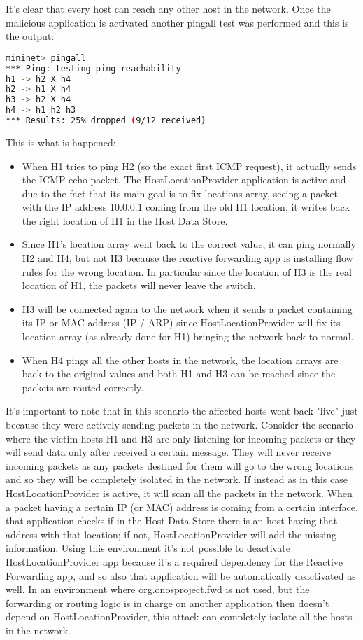 \documentclass[a4paper,10pt]{memoir}
\begin{document}
It's clear that every host can reach any other host in the network. Once the malicious application is activated another pingall test was performed and this is the output:
\begin{lstlisting}[language=bash]
mininet> pingall
*** Ping: testing ping reachability
h1 -> h2 X h4
h2 -> h1 X h4
h3 -> h2 X h4
h4 -> h1 h2 h3
*** Results: 25% dropped (9/12 received)
\end{lstlisting}

This is what is happened:
\begin{itemize}
    \item When H1 tries to ping H2 (so the exact first ICMP request), it actually sends the ICMP echo packet. The HostLocationProvider application is active and due to the fact that its main goal is to fix locations array, seeing a packet with the IP address 10.0.0.1 coming from the old H1 location, it writes back the right location of H1 in the Host Data Store.
    \item Since H1's location array went back to the correct value, it can ping normally H2 and H4, but not H3 because the reactive forwarding app is installing flow rules for the wrong location. In particular since the location of H3 is the real location of H1, the packets will never leave the switch.
    \item H3 will be connected again to the network when it sends a packet containing its IP or MAC address (IP / ARP) since HostLocationProvider will fix its location array (as already done for H1) bringing the network back to normal.
    \item When H4 pings all the other hosts in the network, the location arrays are back to the original values and both H1 and H3 can be reached since the packets are routed correctly.
\end{itemize}

It's important to note that in this scenario the affected hosts went back "live" just because they were actively sending packets in the network. Consider the scenario where the victim hosts H1 and H3 are only listening for incoming packets or they will send data only after received a certain message. They will never receive incoming packets as any packets destined for them will go to the wrong locations and so they will be completely isolated in the network. If instead as in this case HostLocationProvider is active, it will scan all the packets in the network. When a packet having a certain IP (or MAC) address is coming from a certain interface, that application checks if in the Host Data Store there is an host having that address with that location; if not, HostLocationProvider will add the missing information. Using this environment it's not possible to deactivate HostLocationProvider app because it's a required dependency for the Reactive Forwarding app, and so also that application will be automatically deactivated as well. In an environment where org.onosproject.fwd is not used, but the forwarding or routing logic is in charge on another application then doesn't depend on HostLocationProvider, this attack can completely isolate all the hosts in the network.
\end{document}
